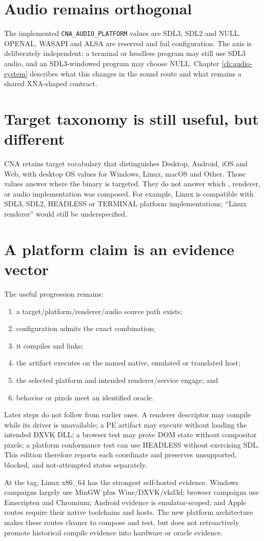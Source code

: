 \section{Audio remains orthogonal}

The implemented \texttt{CNA\_AUDIO\_PLATFORM} values are SDL3, SDL2 and NULL. OPENAL, WASAPI and
ALSA are reserved and fail configuration. The axis is deliberately independent: a terminal or
headless program may still use SDL3 audio, and an SDL3-windowed program may choose NULL. Chapter
\ref{ch:audio-system} describes what this changes in the sound route and what remains a shared
XNA-shaped contract.

\section{Target taxonomy is still useful, but different}

CNA retains target vocabulary that distinguishes Desktop, Android, iOS and Web, with desktop OS
values for Windows, Linux, macOS and Other. Those values answer where the binary is targeted.
They do not answer which , renderer, or audio implementation was composed.
For example, Linux is compatible with SDL3, SDL2, HEADLESS or TERMINAL platform implementations;
``Linux renderer'' would still be underspecified.

\section{A platform claim is an evidence vector}

The useful progression remains:

\begin{enumerate}
  \item a target/platform/renderer/audio source path exists;
  \item configuration admits the exact combination;
  \item it compiles and links;
  \item the artifact executes on the named native, emulated or translated host;
  \item the selected platform and intended renderer/service engage; and
  \item behavior or pixels meet an identified oracle.
\end{enumerate}

Later steps do not follow from earlier ones. A renderer descriptor may compile while its driver is
unavailable; a PE artifact may execute without loading the intended DXVK DLL; a browser test may
prove DOM state without compositor pixels; a platform conformance test can use HEADLESS without
exercising SDL. This edition therefore reports each coordinate and preserves unsupported,
blocked, and not-attempted states separately.

At the tag, Linux x86\_64 has the strongest self-hosted evidence. Windows campaigns largely use
MinGW plus Wine/DXVK/vkd3d; browser campaigns use Emscripten and Chromium; Android evidence is
emulator-scoped; and Apple routes require their native toolchains and hosts. The new platform
architecture makes these routes cleaner to compose and test, but does not retroactively promote
historical compile evidence into hardware or oracle evidence.
